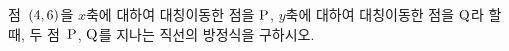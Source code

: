 점~$(4{,}\mkern3mu\mathopen{}6)$을 $x$축에 대하여 대칭이동한 점을 $\mathrm{P}$, $y$축에 대하여 대칭이동한 점을 $\mathrm{Q}$라 할 때, 두 점~$\mathrm{P}$, $\mathrm{Q}$를 지나는 직선의 방정식을 구하시오.
